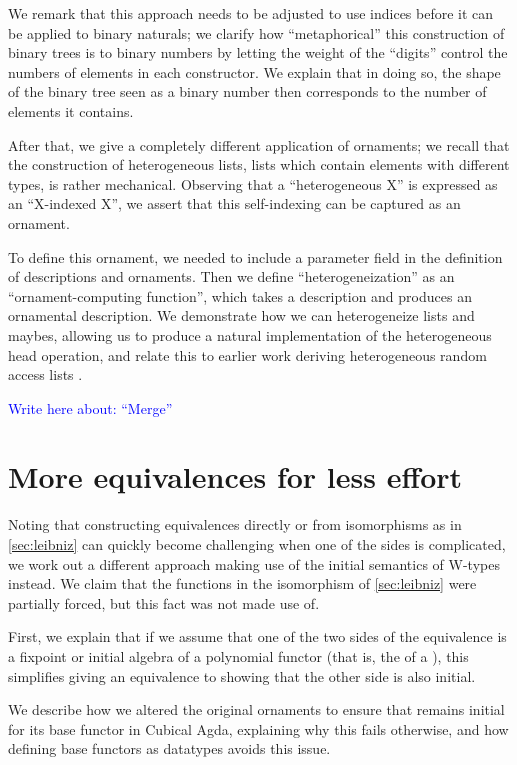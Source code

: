 \documentclass{article}
\theoremstyle{plain}%
\theoremstyle{definition}
\newcommand{\towrite}[1]{\par\textcolor{blue}{Write here about: ``#1''}\par}
\begin{document}
We remark that this approach needs to be adjusted to use indices before it can be applied to binary naturals; we clarify how ``metaphorical'' this construction of binary trees is to binary numbers by letting the weight of the ``digits'' control the numbers of elements in each constructor. We explain that in doing so, the shape of the binary tree seen as a binary number then corresponds to the number of elements it contains.

After that, we give a completely different application of ornaments; we recall that the construction of heterogeneous lists, lists which contain elements with different types, is rather mechanical. Observing that a ``heterogeneous X'' is expressed as an ``X-indexed X'', we assert that this self-indexing can be captured as an ornament.

To define this ornament, we needed to include a parameter field in the definition of descriptions and ornaments. Then we define ``heterogeneization'' as an ``ornament-computing function'', which takes a description and produces an ornamental description. We demonstrate how we can heterogeneize lists and maybes, allowing us to produce a natural implementation of the heterogeneous head operation, and relate this to earlier work deriving heterogeneous random access lists \cite{hetbin}.

\towrite{Merge}



\section{More equivalences for less effort}\label{sec:userfriendly}
Noting that constructing equivalences directly or from isomorphisms as in \autoref{sec:leibniz} can quickly become challenging when one of the sides is complicated, we work out a different approach making use of the initial semantics of W-types instead. We claim that the functions in the isomorphism of \autoref{sec:leibniz} were partially forced, but this fact was not made use of.

First, we explain that if we assume that one of the two sides of the equivalence is a fixpoint or initial algebra of a polynomial functor (that is, the  of a ), this simplifies giving an equivalence to showing that the other side is also initial.

We describe how we altered the original ornaments \cite{progorn} to ensure that  remains initial for its base functor in Cubical Agda, explaining why this fails otherwise, and how defining base functors as datatypes avoids this issue.
\end{document}
